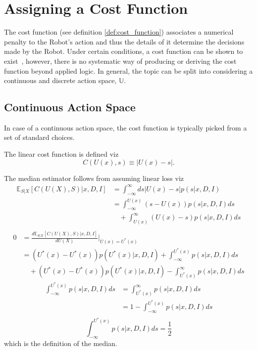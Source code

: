 \chapter{Assigning a Cost Function}
\label{sec:assing_cost}
The cost function (see definition \ref{def:cost_function}) associates a numerical penalty to the Robot's action and thus the details of it determine the decisions made by the Robot. Under certain conditions, a cost function can be shown to exist~\citep{lavalle2006planning}, however, there is no systematic way of producing or deriving the cost function beyond applied logic. In general, the topic can be split into considering a continuous and discrete action space, $\mathbb{U}$. 	

\section{Continuous Action Space}
In case of a continuous action space, the cost function is typically picked from a set of standard choices.	
\begin{definition}
	\label{def:linear_cost_function}
	The linear cost function is defined viz
	\begin{equation}
		C(U(x),s) \equiv |U(x)-s|.
	\end{equation}
	
\end{definition}
\begin{theorem}
	The median estimator follows from assuming linear loss viz
	\begin{equation}
		\begin{split}
			\mathbb{E}_{S|X}[C(U(X), S)|x,D,I] &= \int_{-\infty}^{\infty} ds |U(x)-s| p(s|x,D,I)\\
			&= \int_{-\infty}^{U(x)} (s-U(x))p(s|x,D,I)ds\\
			&\quad+\int_{U(x)}^\infty (U(x)-s)p(s|x,D,I)ds\\
		\end{split}
	\end{equation}
	\begin{equation}
		\begin{split}
			0 &=\frac{d \mathbb{E}_{S|X}[C(U(X), S)|x,D,I]}{dU(X)}\bigg|_{U(x)=U^*(x)}\\
			&= (U^*(x)-U^*(x))p(U^*(x)|x,D,I)+\int_{-\infty}^{U^*(x)} p(s|x,D,I)ds\\
			&\quad+(U^*(x)-U^*(x))p(U^*(x)|x,D,I)-\int_{U^*(x)}^\infty p(s|x,D,I)ds
		\end{split}
	\end{equation}
	\begin{equation}
		\begin{split}
			\int_{-\infty}^{U^*(x)} p(s|x,D,I)ds &= \int_{U^*(x)}^\infty p(s|x,D,I)ds\\
			&= 1- \int_{-\infty}^{U^*(x)} p(s|x,D,I)ds\\
		\end{split}
	\end{equation}
	\begin{equation}
		\int_{-\infty}^{U^*(x)} p(s|x,D,I)ds = \frac{1}{2}
	\end{equation}
	which is the definition of the median.
\end{theorem}

